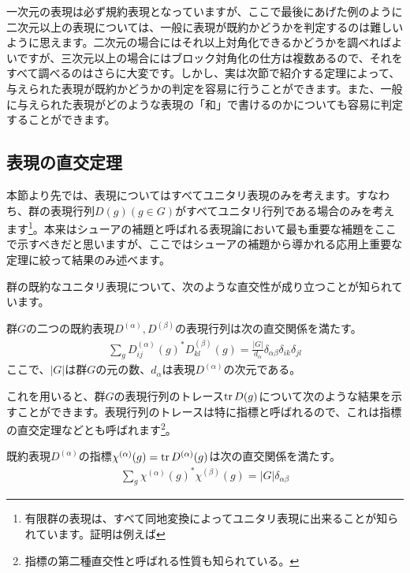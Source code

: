 \documentclass[uplatex,dvipdfmx,a4j]{jsarticle}
\begin{document}
一次元の表現は必ず規約表現となっていますが、ここで最後にあげた例のように二次元以上の表現については、一般に表現が既約かどうかを判定するのは難しいように思えます。二次元の場合にはそれ以上対角化できるかどうかを調べればよいですが、三次元以上の場合にはブロック対角化の仕方は複数あるので、それをすべて調べるのはさらに大変です。しかし、実は次節で紹介する定理によって、与えられた表現が既約かどうかの判定を容易に行うことができます。また、一般に与えられた表現がどのような表現の「和」で書けるのかについても容易に判定することができます。

\subsection{表現の直交定理}
本節より先では、表現についてはすべてユニタリ表現のみを考えます。すなわち、群の表現行列$D(g) (g\in G)$がすべてユニタリ行列である場合のみを考えます\footnote{有限群の表現は、すべて同地変換によってユニタリ表現に出来ることが知られています。証明は例えば\cite{ouyougunron}}。本来はシューアの補題と呼ばれる表現論において最も重要な補題をここで示すべきだと思いますが、ここではシューアの補題から導かれる応用上重要な定理に絞って結果のみ述べます。

	

群の既約なユニタリ表現について、次のような直交性が成り立つことが知られています。
\begin{tcolorbox}[title=定理：表現行列の直交性]
	群$G$の二つの既約表現$D^{(\alpha)}, D^{(\beta)}$の表現行列は次の直交関係を満たす。
	\begin{align}
		\sum_g D^{(\alpha)}_{ij}(g)^* D^{(\beta)}_{kl}(g) = \frac{|G|}{d_\alpha} \delta_{\alpha\beta}\delta_{ik}\delta_{jl}
	\end{align}
	ここで、$|G|$は群$G$の元の数、$d_\alpha$は表現$D^{(\alpha)}$の次元である。
\end{tcolorbox}

これを用いると、群$G$の表現行列のトレース$\tr D(g)$について次のような結果を示すことができます。表現行列のトレースは特に指標と呼ばれるので、これは指標の直交定理などとも呼ばれます\footnote{指標の第二種直交性と呼ばれる性質も知られている。}。

\begin{tcolorbox}[title=指標の第一種直交性]
	既約表現$D^{(\alpha)}$の指標$\chi^{(\alpha)}(g) = \tr D^{(\alpha)}(g)$は次の直交関係を満たす。
	\begin{align}
		\sum_g \chi^{(\alpha)}(g)^* \chi^{(\beta)}(g) = |G|\delta_{\alpha\beta} \label{eq:character_orthogonality}
	\end{align}
\end{tcolorbox}
\end{document}
